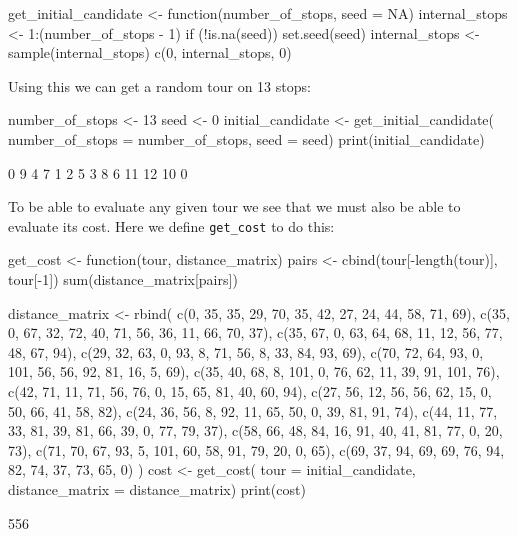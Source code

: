 \begin{Rin}
get_initial_candidate <- function(number_of_stops, seed = NA){
    internal_stops <- 1:(number_of_stops - 1)
    if (!is.na(seed)) {
      set.seed(seed)
      internal_stops <- sample(internal_stops)
    }
    c(0, internal_stops, 0)
}
\end{Rin}

Using this we can get a random tour on 13 stops:

\begin{Rin}
number_of_stops <- 13
seed <- 0
initial_candidate <- get_initial_candidate(
    number_of_stops = number_of_stops,
    seed = seed)
print(initial_candidate)
\end{Rin}

\begin{Rout}
 [1]  0  9  4  7  1  2  5  3  8  6 11 12 10  0
\end{Rout}

To be able to evaluate any given tour we see that we must also be able to
evaluate its cost. Here we define \texttt{get_cost} to do this:

\begin{Rin}
get_cost <- function(tour, distance_matrix){
    pairs <-  cbind(tour[-length(tour)], tour[-1])
    sum(distance_matrix[pairs])
}
\end{Rin}

\begin{Rin}
distance_matrix <- rbind(
        c(0, 35, 35, 29, 70, 35, 42, 27, 24, 44, 58, 71, 69),
        c(35, 0, 67, 32, 72, 40, 71, 56, 36, 11, 66, 70, 37),
        c(35, 67, 0, 63, 64, 68, 11, 12, 56, 77, 48, 67, 94),
        c(29, 32, 63, 0, 93, 8, 71, 56, 8, 33, 84, 93, 69),
        c(70, 72, 64, 93, 0, 101, 56, 56, 92, 81, 16, 5, 69),
        c(35, 40, 68, 8, 101, 0, 76, 62, 11, 39, 91, 101, 76),
        c(42, 71, 11, 71, 56, 76, 0, 15, 65, 81, 40, 60, 94),
        c(27, 56, 12, 56, 56, 62, 15, 0, 50, 66, 41, 58, 82),
        c(24, 36, 56, 8, 92, 11, 65, 50, 0, 39, 81, 91, 74),
        c(44, 11, 77, 33, 81, 39, 81, 66, 39, 0, 77, 79, 37),
        c(58, 66, 48, 84, 16, 91, 40, 41, 81, 77, 0, 20, 73),
        c(71, 70, 67, 93, 5, 101, 60, 58, 91, 79, 20, 0, 65),
        c(69, 37, 94, 69, 69, 76, 94, 82, 74, 37, 73, 65, 0)
)
cost <- get_cost(
    tour = initial_candidate,
    distance_matrix = distance_matrix)
print(cost)
\end{Rin}

\begin{Rout}
[1] 556
\end{Rout}

